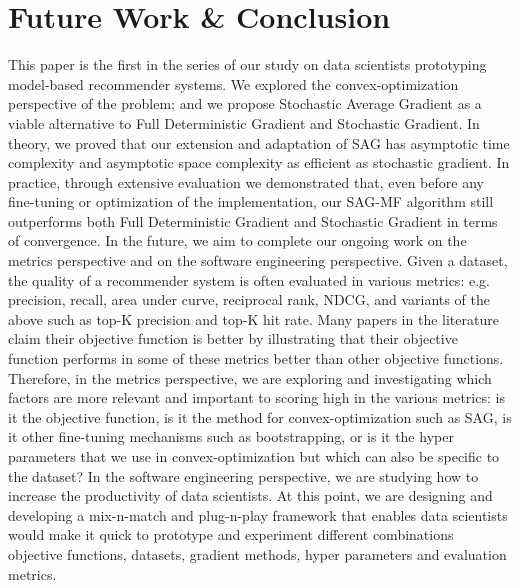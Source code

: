 \section{Future Work \& Conclusion}
This paper is the first in the series of our study on data scientists prototyping model-based recommender systems.
We explored the convex-optimization perspective of the problem; and we propose Stochastic Average Gradient as a viable alternative to Full Deterministic Gradient and Stochastic Gradient.
In theory, we proved that our extension and adaptation of SAG has asymptotic time complexity and asymptotic space complexity as efficient as stochastic gradient.
In practice, through extensive evaluation we demonstrated that, even before any fine-tuning or optimization of the implementation, our SAG-MF algorithm still outperforms both Full Deterministic Gradient and Stochastic Gradient in terms of convergence.
In the future, we aim to complete our ongoing work on the metrics perspective and on the software engineering perspective.  
Given a dataset, the quality of a recommender system is often evaluated in various metrics: e.g. precision, recall, area under curve, reciprocal rank, NDCG, and variants of the above such as top-K precision and top-K hit rate.
Many papers in the literature claim their objective function is better by illustrating that their objective function performs in some of these metrics better than other objective functions.  
Therefore, in the metrics perspective, we are exploring and investigating which factors are more relevant and important to scoring high in the various metrics: is it the objective function, is it the method for convex-optimization such as SAG, is it other fine-tuning mechanisms such as bootstrapping, or is it the hyper parameters that we use in convex-optimization but which can also be specific to the dataset?
In the software engineering perspective, we are studying how to increase the productivity of data scientists.  At this point, we are designing and developing a mix-n-match and plug-n-play framework that enables data scientists would make it quick to prototype and experiment different combinations objective functions, datasets, gradient methods, hyper parameters and evaluation metrics.  
